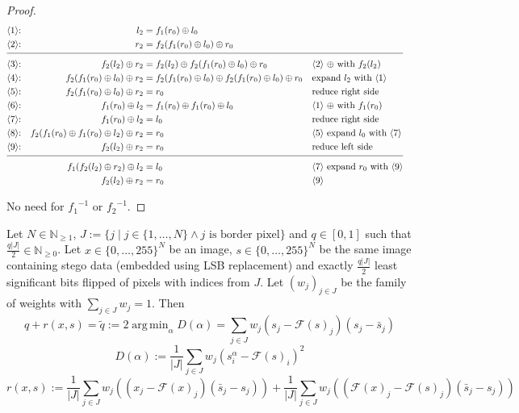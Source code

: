 \documentclass{uibk}
\DeclareMathOperator*{\argmin}{arg\,min}
\begin{document}
\begin{proof}
    \begin{align*}
        \text{〈1〉:} && l_2 &= f_1(r_0) \oplus l_0 \\
        \text{〈2〉:} && r_2 &= f_2(f_1(r_0) \oplus l_0) \oplus r_0 \\[-0.8em]
        \cline{1-6}
        \text{〈3〉:} && f_2(l_2) \oplus r_2 &= f_2(l_2) \oplus f_2(f_1(r_0) \oplus l_0) \oplus r_0
        && \text{〈2〉 $\oplus$ with $f_2(l_2)$} \\
        \text{〈4〉:} && f_2(f_1(r_0) \oplus l_0) \oplus r_2 &= f_2(f_1(r_0) \oplus l_0) \oplus f_2(f_1(r_0) \oplus l_0) \oplus r_0
        && \text{expand $l_2$ with 〈1〉} \\
        \text{〈5〉:} && f_2(f_1(r_0) \oplus l_0) \oplus r_2 &= r_0
        && \text{reduce right side} \\
        \text{〈6〉:} && f_1(r_0) \oplus l_2 &= f_1(r_0) \oplus f_1(r_0) \oplus l_0
        && \text{〈1〉 $\oplus$ with $f_1(r_0)$} \\
        \text{〈7〉:} && f_1(r_0) \oplus l_2 &= l_0
        && \text{reduce right side} \\
        \text{〈8〉:} && f_2(f_1(r_0) \oplus f_1(r_0) \oplus l_2) \oplus r_2 &= r_0
        && \text{〈5〉 expand $l_0$ with 〈7〉} \\
        \text{〈9〉:} && f_2(l_2) \oplus r_2 &= r_0
        && \text{reduce left side} \\[-0.8em]
        \cline{1-6}
        && f_1(f_2(l_2) \oplus r_2) \oplus l_2 &= l_0 && \text{〈7〉 expand $r_0$ with 〈9〉} \\
        && f_2(l_2) \oplus r_2 &= r_0 && \text{〈9〉}
    \end{align*}

    No need for ${f_1}^{-1}$ or ${f_2}^{-1}$.
\end{proof}

\begin{corollary}
    Let $N \in \mathbb{N}_{\ge 1}$, $J := \{j \mid j \in \{1, \dots, N\}
    \land j \text{ is border pixel}\}$ and $q \in \left[0, 1\right]$ such that
    $\frac{q |J|}{2} \in \mathbb{N}_{\ge 0}$. Let $x \in \{0, \dots, 255\}^N$
    be an image, $s \in \{0, \dots, 255\}^N$ be the same image containing stego
    data (embedded using LSB replacement) and exactly $\frac{q |J|}{2}$ least
    significant bits flipped of pixels with indices from $J$. Let $(w_j)_{j \in
    J}$ be the family of weights with $\sum\limits_{j \in J}w_j = 1$. Then
    \[
        q + r(x, s) = \tilde{q} := 2 \argmin_\alpha D(\alpha) = \sum\limits_{j \in J} w_j (s_j - \mathcal{F}(s)_j) (s_j - \bar{s}_j)
    \]
    \[
        D(\alpha) := \frac{1}{|J|} \sum\limits_{j \in J} w_j \left(s_i^\alpha - \mathcal{F}(s)_i\right)^2
    \]
    \[
        r(x, s) := \frac{1}{|J|} \sum\limits_{j \in J} w_j \left((x_j - \mathcal{F}(x)_j)(\bar{s}_j - s_j)\right) + \frac{1}{|J|} \sum\limits_{j \in J} w_j \left((\mathcal{F}(x)_j - \mathcal{F}(s)_j)(\bar{s}_j - s_j)\right)
    \]
\end{corollary}
\end{document}
